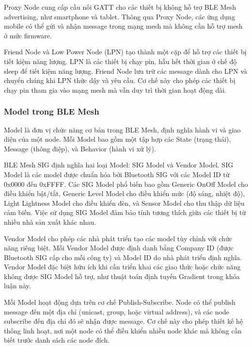 Proxy Node cung cấp cầu nối GATT cho các thiết bị không hỗ trợ BLE Mesh advertising, như smartphone và tablet. Thông qua Proxy Node, các ứng dụng mobile có thể gửi và nhận message trong mạng mesh mà không cần hỗ trợ mesh ở mức firmware.

Friend Node và Low Power Node (LPN) tạo thành một cặp để hỗ trợ các thiết bị tiết kiệm năng lượng. LPN là các thiết bị chạy pin, hầu hết thời gian ở chế độ sleep để tiết kiệm năng lượng. Friend Node lưu trữ các message dành cho LPN và chuyển chúng khi LPN thức dậy và yêu cầu. Cơ chế này cho phép các thiết bị chạy pin tham gia vào mạng mesh mà vẫn duy trì thời gian hoạt động dài.

\subsubsection{Model trong BLE Mesh}

Model là đơn vị chức năng cơ bản trong BLE Mesh, định nghĩa hành vi và giao diện của một node. Mỗi Model bao gồm một tập hợp các State (trạng thái), Message (thông điệp), và Behavior (hành vi xử lý).

BLE Mesh SIG định nghĩa hai loại Model: SIG Model và Vendor Model. SIG Model là các model được chuẩn hóa bởi Bluetooth SIG với các Model ID từ 0x0000 đến 0xFFFF. Các SIG Model phổ biến bao gồm Generic OnOff Model cho điều khiển bật/tắt, Generic Level Model cho điều khiển mức (độ sáng, nhiệt độ), Light Lightness Model cho điều khiển đèn, và Sensor Model cho thu thập dữ liệu cảm biến. Việc sử dụng SIG Model đảm bảo tính tương thích giữa các thiết bị từ nhiều nhà sản xuất khác nhau.

Vendor Model cho phép các nhà phát triển tạo các model tùy chỉnh với chức năng riêng biệt. Mỗi Vendor Model được định danh bằng Company ID (được Bluetooth SIG cấp cho mỗi công ty) và Model ID do nhà phát triển định nghĩa. Vendor Model đặc biệt hữu ích khi cần triển khai các giao thức hoặc chức năng không được SIG Model hỗ trợ, như thuật toán định tuyến Gradient trong khóa luận này.

Mỗi Model hoạt động dựa trên cơ chế Publish-Subscribe. Node có thể publish message đến một địa chỉ (unicast, group, hoặc virtual address), và các node subscribe đến địa chỉ đó sẽ nhận được message. Cơ chế này cho phép thiết kế hệ thống linh hoạt, nơi một node có thể điều khiển nhiều node khác mà không cần biết trước danh sách các node đích.

